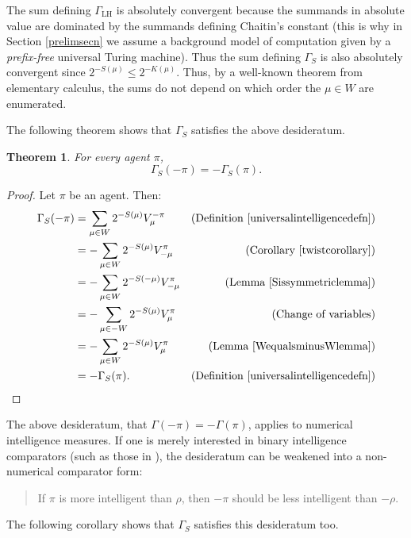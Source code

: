 \documentclass{article}
\newtheorem{theorem}{Theorem}
\def\LH{\textrm{LH}}
\def\SYM{S}
\begin{document}
The sum defining $\Gamma_{\LH}$ is absolutely convergent because the summands
in absolute value are dominated by the summands defining Chaitin's constant
(this is why in Section \ref{prelimsecn} we assume a background model of computation
given by a \emph{prefix-free} universal Turing machine).
Thus the sum defining
$\Gamma_{\SYM}$ is also
absolutely convergent since $2^{-S(\mu)}\leq 2^{-K(\mu)}$. Thus, by a well-known
theorem from elementary calculus, the sums do not depend on which order the $\mu\in W$
are enumerated.

The following theorem shows that $\Gamma_{\SYM}$ satisfies the above desideratum.

\begin{theorem}
\label{maintheorem}
    For every agent $\pi$,
    \[
        \Gamma_{\SYM}(-\pi) = -\Gamma_{\SYM}(\pi).
    \]
\end{theorem}

\begin{proof}
    Let $\pi$ be an agent. Then:
    \begin{align*}
        \Gamma_{\SYM}(-\pi) &= \sum_{\mu\in W} 2^{-S(\mu)}V^{-\pi}_\mu
            &\mbox{(Definition \ref{universalintelligencedefn})}\\
          &= -\sum_{\mu\in W} 2^{-S(\mu)}V^\pi_{-\mu}
            &\mbox{(Corollary \ref{twistcorollary})}\\
          &= -\sum_{\mu\in W} 2^{-S(-\mu)}V^\pi_{-\mu}
            &\mbox{(Lemma \ref{Sissymmetriclemma})}\\
          &= -\sum_{\mu\in -W} 2^{-S(\mu)}V^\pi_\mu
            &\mbox{(Change of variables)}\\
          &= -\sum_{\mu\in W} 2^{-S(\mu)}V^\pi_\mu
            &\mbox{(Lemma \ref{WequalsminusWlemma})}\\
          &= -\Gamma_{\SYM}(\pi).
            &\mbox{(Definition \ref{universalintelligencedefn})}
    \end{align*}
\end{proof}

The above desideratum, that $\Gamma(-\pi)=-\Gamma(\pi)$, applies to
numerical intelligence measures. If one is merely interested in binary
intelligence comparators (such as those in \cite{alexander2019intelligence}),
the desideratum can be weakened into a non-numerical comparator form:
\begin{quote}
    If $\pi$ is more intelligent than $\rho$,
    then $-\pi$ should be less intelligent than $-\rho$.
\end{quote}
The following corollary shows that $\Gamma_{\SYM}$ satisfies this desideratum too.
\end{document}
